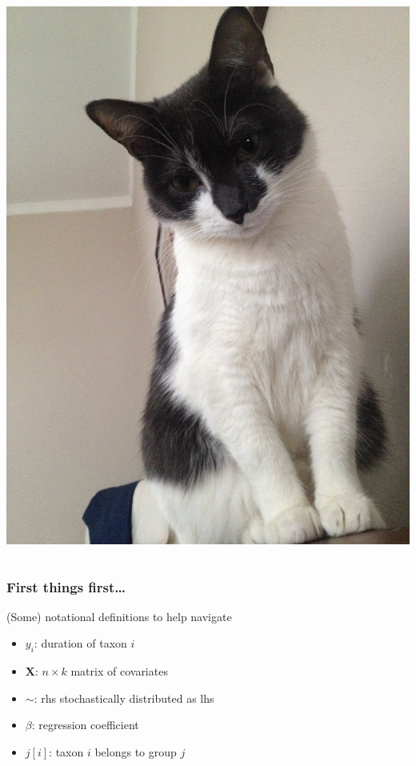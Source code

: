 \documentclass{beamer}
\begin{document}
\begin{frame}
\begin{columns}
\begin{column}{0.5\textwidth}
\begin{center}
        \includegraphics[height = 0.4\textheight, keepaspectratio = true]{figure/annyong}
      \end{center}
    \end{column}
  \end{columns}
\end{frame}

\begin{frame}
  \frametitle{First things first\dots}

  \begin{block}{(Some) notational definitions to help navigate}
    \begin{itemize}
      \item \(y_{i}\): duration of taxon \(i\)
      \item \(\mathbf{X}\): \(n \times k\) matrix of covariates
      \item \(\sim\): rhs stochastically distributed as lhs
      \item \(\beta\): regression coefficient
      \item \(j[i]\): taxon \(i\) belongs to group \(j\)
    \end{itemize}
  \end{block}
\end{frame}
\end{document}
